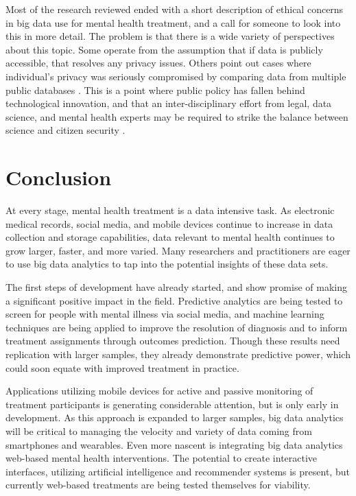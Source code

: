 \documentclass[sigconf]{acmart}
\begin{document}
Most of the research reviewed ended with a short description of ethical concerns in big data use for mental health treatment, and a call for someone to look into this in more detail. The problem is that there is a wide variety of perspectives about this topic. Some operate from the assumption that if data is publicly accessible, that resolves any privacy issues. Others point out cases where individual's privacy was seriously compromised by comparing data from multiple public databases \cite{ethicsdivide}. This is a point where public policy has fallen behind technological innovation, and that an inter-disciplinary effort from legal, data science, and mental health experts may be required to strike the balance between science and citizen security \cite{datalaw}.

\section{Conclusion}

At every stage, mental health treatment is a data intensive task. As electronic medical records, social media, and mobile devices continue to increase in data collection and storage capabilities, data relevant to mental health continues to grow larger, faster, and more varied. Many researchers and practitioners are eager to use big data analytics to tap into the potential insights of these data sets.

The first steps of development have already started, and show promise of making a significant positive impact in the field. Predictive analytics are being tested to screen for people with mental illness via social media, and machine learning techniques are being applied to improve the resolution of diagnosis and to inform treatment assignments through outcomes prediction. Though these results need replication with larger samples, they already demonstrate predictive power, which could soon equate with improved treatment in practice.

Applications utilizing mobile devices for active and passive monitoring of treatment participants is generating considerable attention, but is only early in development. As this approach is expanded to larger samples, big data analytics will be critical to managing the velocity and variety of data coming from smartphones and wearables. Even more nascent is integrating big data analytics web-based mental health interventions. The potential to create interactive interfaces, utilizing artificial intelligence and recommender systems is present, but currently web-based treatments are being tested themselves for viability.
\end{document}
